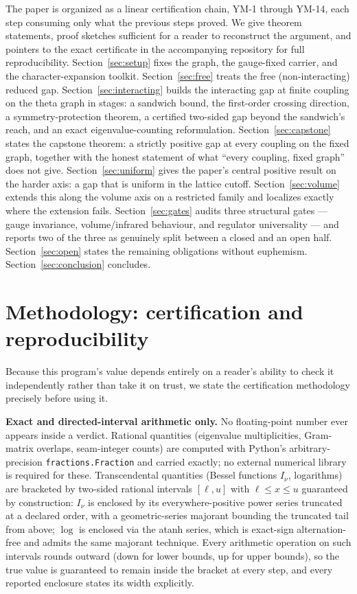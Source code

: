 \documentclass[aps,prd,twocolumn,superscriptaddress,nofootinbib]{revtex4-2}
\begin{document}
The paper is organized as a linear certification chain, YM-1 through
YM-14, each step consuming only what the previous steps proved. We give
theorem statements, proof sketches sufficient for a reader to reconstruct
the argument, and pointers to the exact certificate in the accompanying
repository for full reproducibility. Section~\ref{sec:setup} fixes the
graph, the gauge-fixed carrier, and the character-expansion toolkit.
Section~\ref{sec:free} treats the free (non-interacting) reduced gap.
Section~\ref{sec:interacting} builds the interacting gap at finite
coupling on the theta graph in stages: a sandwich bound, the first-order
crossing direction, a symmetry-protection theorem, a certified two-sided
gap beyond the sandwich's reach, and an exact eigenvalue-counting
reformulation. Section~\ref{sec:capstone} states the capstone theorem: a
strictly positive gap at every coupling on the fixed graph, together with
the honest statement of what ``every coupling, fixed graph'' does not
give. Section~\ref{sec:uniform} gives the paper's central positive
result on the harder axis: a gap that is uniform in the lattice cutoff.
Section~\ref{sec:volume} extends this along the volume axis on a
restricted family and localizes exactly where the extension fails.
Section~\ref{sec:gates} audits three structural gates --- gauge
invariance, volume/infrared behaviour, and regulator universality --- and
reports two of the three as genuinely split between a closed and an open
half. Section~\ref{sec:open} states the remaining obligations without
euphemism. Section~\ref{sec:conclusion} concludes.

\section{Methodology: certification and reproducibility}\label{sec:method}

Because this program's value depends entirely on a reader's ability to
check it independently rather than take it on trust, we state the
certification methodology precisely before using it.

\textbf{Exact and directed-interval arithmetic only.} No floating-point
number ever appears inside a verdict. Rational quantities (eigenvalue
multiplicities, Gram-matrix overlaps, seam-integer counts) are computed
with Python's arbitrary-precision \texttt{fractions.Fraction} and
carried exactly; no external numerical library is required for these.
Transcendental quantities (Bessel functions $I_\nu$, logarithms) are
bracketed by two-sided rational intervals $[\ell,u]$ with $\ell\le
x\le u$ guaranteed by construction: $I_\nu$ is enclosed by its
everywhere-positive power series truncated at a declared order, with a
geometric-series majorant bounding the truncated tail from above; $\log$
is enclosed via the atanh series, which is exact-sign alternation-free
and admits the same majorant technique. Every arithmetic operation on
such intervals rounds outward (down for lower bounds, up for upper
bounds), so the true value is guaranteed to remain inside the bracket at
every step, and every reported enclosure states its width explicitly.
\end{document}
